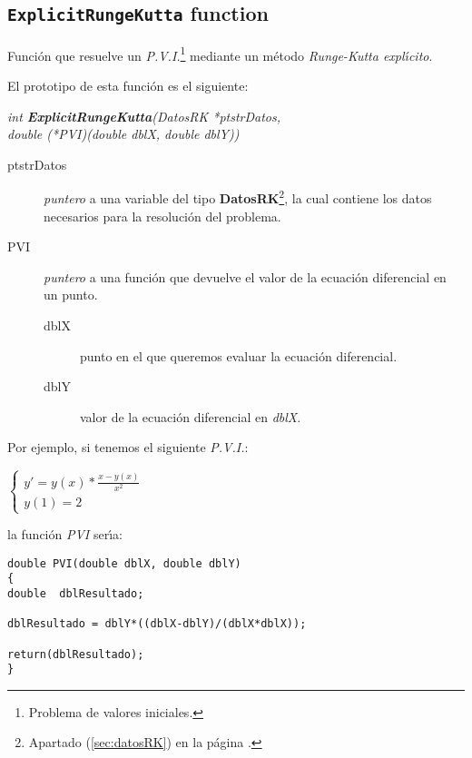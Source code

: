 \subsection{\texttt{ExplicitRungeKutta} function}

Funci\'on que resuelve un \emph{P.V.I.}\footnote{Problema de valores 
iniciales.} mediante un m\'etodo \emph{Runge-Kutta expl\'{\i}cito}.\newline

El prototipo de esta funci\'on es el siguiente:

\begin{center}
\emph{int \textbf{ExplicitRungeKutta}(DatosRK *ptstrDatos,\\
double (*PVI)(double dblX, double dblY))}
\end{center} 

\begin{description}
\item[ptstrDatos] \emph{puntero} a una variable del tipo 
\textbf{DatosRK}\footnote{Apartado (\ref{sec:datosRK}) en la p\'agina 
\pageref{sec:datosRK}.}, la cual contiene los datos necesarios para
la resoluci\'on del problema.
\item[PVI] \emph{puntero} a una funci\'on que devuelve el valor de la
ecuaci\'on diferencial en un punto.
\begin{description}
	\item[dblX] punto en el que queremos evaluar la ecuaci\'on diferencial.
	\item[dblY] valor de la ecuaci\'on diferencial en \emph{dblX}.
\end{description}
\end{description}

Por ejemplo, si tenemos el siguiente \emph{P.V.I.}:

\begin{center}
$
\left \{ \begin{array}{l}
y' = y(x) * \frac{x-y(x)}{x^2} \\
y(1) = 2
\end{array} \right.
$
\end{center}

la funci\'on \emph{PVI} ser\'{\i}a:

\begin{verbatim}
double PVI(double dblX, double dblY)
{
double  dblResultado;

dblResultado = dblY*((dblX-dblY)/(dblX*dblX));

return(dblResultado);
}
\end{verbatim}

